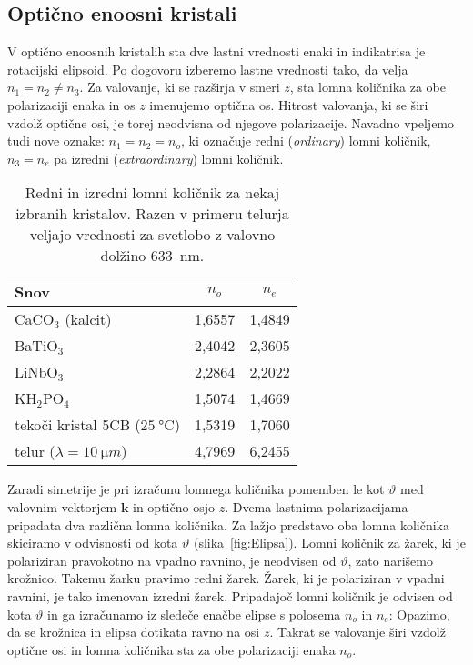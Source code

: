 \subsection*{Optično enoosni kristali}
V optično enoosnih kristalih sta dve lastni vrednosti enaki in indikatrisa je rotacijski 
elipsoid. Po dogovoru izberemo lastne vrednosti tako, da velja $n_{1}=n_{2}\neq n_{3}$. 
Za valovanje, ki se razširja v smeri $z$, sta lomna količnika za obe polarizaciji 
enaka in os $z$ imenujemo optična os. Hitrost valovanja, ki
se širi vzdolž optične osi, je torej neodvisna od njegove polarizacije.
Navadno vpeljemo tudi nove oznake: $n_{1}=n_{2}=n_{o}$, ki označuje redni (\textit{ordinary})
lomni količnik, $n_{3}=n_{e}$ pa izredni 
(\textit{extraordinary}) lomni količnik. 

\begin{table}[h]
 \centering
\begin{tabular}{|l|c|c|} \hline  
      Snov & $n_o$ & $n_e$ \\ \hline
      CaCO$_3$ (kalcit) & 1,6557 & 1,4849 \\ \hline
      BaTiO$_3$ & 2,4042 & 2,3605 \\ \hline
      LiNbO$_3$ & 2,2864 & 2,2022 \\ \hline
      KH$_2$PO$_4$ & 1,5074 & 1,4669 \\ \hline
      tekoči kristal 5CB ($25~\si{\degreeCelsius}$) & 1,5319 & 1,7060 \\ \hline
      telur ($\lambda = 10~\si{\micro m}$) & 4,7969 & 6,2455 \\
\hline 
\end{tabular}
  \caption{Redni in izredni lomni količnik za nekaj izbranih kristalov. Razen v primeru telurja
   veljajo vrednosti za svetlobo z valovno dolžino 633~nm.}
\label{table:none}
\end{table}

Zaradi simetrije je pri izračunu lomnega količnika pomemben le kot 
$\vartheta$ med valovnim vektorjem $\mathbf{k}$ in optično osjo $z$. Dvema 
lastnima polarizacijama pripadata dva različna lomna količnika. 
Za lažjo predstavo oba lomna količnika skiciramo v odvisnosti
od kota $\vartheta$ (slika~\ref{fig:Elipsa}). Lomni količnik za žarek, ki
je polariziran pravokotno na vpadno ravnino, je neodvisen od $\vartheta$, zato narišemo krožnico.
Takemu žarku pravimo redni žarek. 
Žarek, ki je polariziran v vpadni ravnini, je tako imenovan izredni žarek. Pripadajoč
lomni količnik je odvisen od kota $\vartheta$ in ga izračunamo iz sledeče enačbe elipse
s polosema $n_o$ in $n_e$: 
Opazimo, da se krožnica in elipsa dotikata ravno na osi $z$. Takrat se 
valovanje širi vzdolž optične osi in lomna količnika sta za obe polarizaciji enaka $n_o$. 

